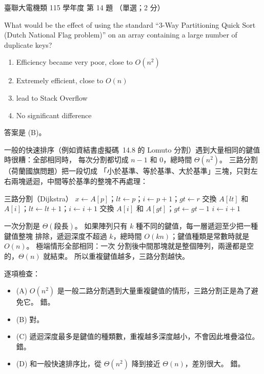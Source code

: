 \begin{pastexam}[label={px:ust-115-ee-ds-14}]{臺聯大電機類 115 學年度 第 14 題}
（單選；2 分）

What would be the effect of using the standard ``3-Way Partitioning Quick Sort (Dutch National
Flag problem)'' on an array containing a large number of duplicate keys?
\begin{enumerate}[label=(\Alph*)]
\item Efficiency became very poor, close to $O(n^2)$
\item Extremely efficient, close to $O(n)$
\item lead to Stack Overflow
\item No significant difference
\end{enumerate}
\end{pastexam}

\begin{pastsoln}
答案是 (B)。

一般的快速排序（例如資結書虛擬碼~14.8 的 Lomuto 分割）遇到大量相同的鍵值時很糟：全部相同時，
每次分割都切成 $n - 1$ 和 $0$，總時間 $\Theta(n^2)$。 三路分割（荷蘭國旗問題）把一段切成
「小於基準、等於基準、大於基準」三塊，只對左右兩塊遞迴，中間等於基準的整塊不再處理：
\begin{pseudo}{三路分割（Dijkstra）}
        \State \Return
    \EndIf
    \State $x \gets A[p]$；$\mathit{lt} \gets p$；$i \gets p + 1$；$\mathit{gt} \gets r$
            \State 交換 $A[\mathit{lt}]$ 和 $A[i]$；$\mathit{lt} \gets \mathit{lt} + 1$；$i \gets i + 1$
            \State 交換 $A[i]$ 和 $A[\mathit{gt}]$；$\mathit{gt} \gets \mathit{gt} - 1$
        \Else
            \State $i \gets i + 1$
        \EndIf
    \EndWhile
    \State {} 
    \State {}
\EndProcedure
\end{pseudo}
一次分割是 $\Theta(\text{段長})$。 如果陣列只有 $k$ 種不同的鍵值，每一層遞迴至少把一種鍵值整塊
排除，遞迴深度不超過 $k$，總時間 $O(kn)$；鍵值種類是常數時就是 $O(n)$。 極端情形全部相同：一次
分割後中間那塊就是整個陣列，兩邊都是空的，$\Theta(n)$ 就結束。 所以重複鍵值越多，三路分割越快。

逐項檢查：
\begin{itemize}
\item (A) $O(n^2)$ 是一般二路分割遇到大量重複鍵值的情形，三路分割正是為了避免它。 錯。
\item (B) 對。
\item (C) 遞迴深度最多是鍵值的種類數，重複越多深度越小，不會因此堆疊溢位。 錯。
\item (D) 和一般快速排序比，從 $\Theta(n^2)$ 降到接近 $\Theta(n)$，差別很大。 錯。
\end{itemize}
\end{pastsoln}
